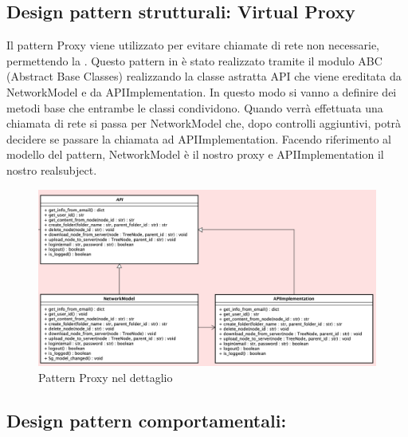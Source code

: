 \subsection{Design pattern strutturali: Virtual Proxy}
Il pattern Proxy viene utilizzato per evitare chiamate di rete non necessarie, permettendo la .\newline{}
Questo pattern in  è stato realizzato tramite il modulo ABC (Abstract Base Classes) realizzando la classe astratta API che viene ereditata da NetworkModel e da APIImplementation. In questo modo si vanno a definire dei metodi base che entrambe le classi condividono. Quando verrà effettuata una chiamata di rete si passa per NetworkModel che, dopo controlli aggiuntivi, potrà decidere se passare la chiamata ad APIImplementation. Facendo riferimento al modello del pattern, NetworkModel è il nostro proxy e APIImplementation il nostro realsubject.
\begin{figure}[H]
    \centering
    \includegraphics[scale = 0.45]{components/img/proxy-model.png}
    \caption{Pattern Proxy nel dettaglio}
    \label{fig:Pattern proxy nel dettaglio}
\end{figure}
\subsection{Design pattern comportamentali:}
